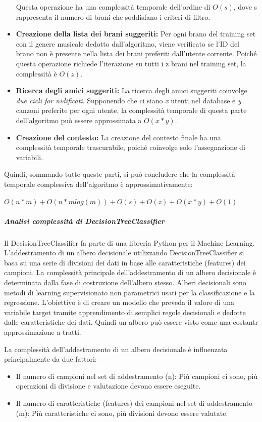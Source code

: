 \begin{itemize}
    Questa operazione ha una complessità temporale dell'ordine di $O(s)$, dove s rappresenta il 
    numero di brani che soddisfano i criteri di filtro.
    \item \textbf{Creazione della lista dei brani suggeriti:} Per ogni brano del training set con il genere musicale dedotto
    dall'algoritmo, viene verificato se l'ID del brano non è presente nella lista dei brani preferiti dall'utente corrente. 
    Poiché questa operazione richiede l'iterazione su tutti i z brani nel training set, la complessità è $O(z)$.
    \item \textbf{Ricerca degli amici suggeriti:} La ricerca degli amici suggeriti coinvolge \textit{due cicli for nidificati}. 
    Supponendo che ci siano \textit{x} utenti nel database e \textit{y} canzoni preferite per ogni utente, la complessità temporale di questa
    parte dell'algoritmo può essere approssimata a $O(x * y)$.
    \item \textbf{Creazione del contesto:} La creazione del contesto finale ha una complessità temporale trascurabile, 
    poiché coinvolge solo l'assegnazione di variabili.
\end{itemize}
Quindi, sommando tutte queste parti, si può concludere che la complessità temporale complessiva dell'algoritmo 
è approssimativamente:

\boldmath
\begin{center}
    $O(n * m) + O(n * m log(m)) + O(s) + O(z) + O(x * y) + O(1)$
\end{center}
\unboldmath


\subparagraph{Analisi complessità di \textit{DecisionTreeClassifier}}
Il DecisionTreeClassifier fa parte di una libreria Python per il Machine Learning.
L'addestramento di un albero decisionale utilizzando DecisionTreeClassifier si basa 
su una serie di divisioni dei dati in base alle caratteristiche (features) dei campioni.
La complessità principale dell'addestramento di un albero decisionale è determinata 
dalla fase di costruzione dell'albero stesso.
Alberi decisionali sono metodi di learning supervisionato non parametrici usati per la classificazione
e la regressione. L'obiettivo è di creare un modello che preveda il valore di una variabile target tramite 
apprendimento di semplici regole decisionali e dedotte dalle caratteristiche dei dati. Quindi 
un albero può essere visto come una costantr approssimazione a tratti.


La complessità dell'addestramento di un albero decisionale è influenzata 
principalmente da due fattori:
\begin{itemize}
    \item Il numero di campioni nel set di addestramento (n): Più campioni ci sono, 
        più operazioni di divisione e valutazione devono essere eseguite.
    \item Il numero di caratteristiche (features) dei campioni nel set di addestramento (m): 
        Più caratteristiche ci sono, più divisioni devono essere valutate.
\end{itemize}

